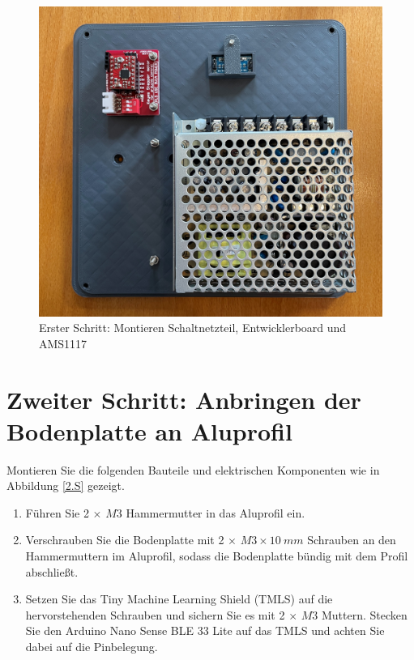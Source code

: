 \begin{figure}[H]
	\begin{center}
		\includegraphics[width=\textwidth]{Images/1Schr.jpg}
		\caption{Erster Schritt: Montieren Schaltnetzteil, Entwicklerboard und AMS1117} \label{1.S}
	\end{center}
\end{figure}


\section{Zweiter Schritt: Anbringen der Bodenplatte an Aluprofil}

Montieren Sie die folgenden Bauteile und elektrischen Komponenten wie in Abbildung \ref{2.S} gezeigt.

\begin{enumerate}
	\item Führen Sie 2 $\times$ $ M3 $ Hammermutter in das Aluprofil ein.
	\item Verschrauben Sie die Bodenplatte mit 2 $\times$ $ M3 \times 10 \ mm $ Schrauben an den Hammermuttern im Aluprofil, sodass die Bodenplatte bündig mit dem Profil abschließt.
	\item Setzen Sie das Tiny Machine Learning Shield (TMLS) auf die hervorstehenden Schrauben und sichern Sie es mit 2 $\times$ $ M3 $ Muttern.
	Stecken Sie den Arduino Nano Sense BLE 33 Lite auf das TMLS und achten Sie dabei auf die Pinbelegung.
\end{enumerate}

